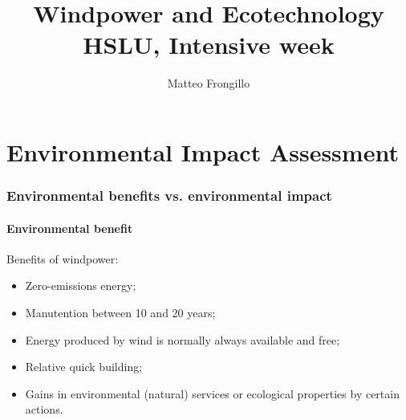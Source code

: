 \documentclass{article}
\title{\textbf{Windpower and Ecotechnology\\HSLU, Intensive week}}
\author{Matteo Frongillo}
\date{}
\begin{document}
\maketitle
\tableofcontents
\pagebreak

\part{Environmental Impact Assessment}
\section{Environmental benefits vs. environmental impact}
\subsection{Environmental benefit}
Benefits of windpower:
\begin{itemize}
    \item Zero-emissions energy;
    \item Manutention between 10 and 20 years;
    \item Energy produced by wind is normally always available and free;
    \item Relative quick building;
    \item Gains in environmental (natural) services or ecological properties
        by certain actions.
\end{itemize}
\end{document}
